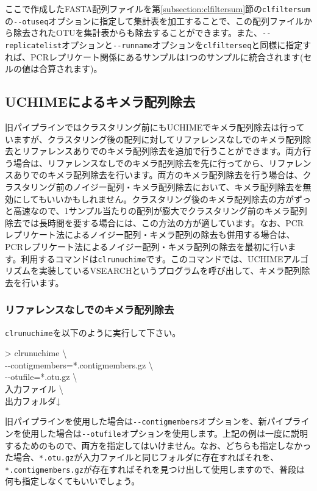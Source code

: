 \documentclass[titlepage,10pt,a4paper]{jsbook}
\newenvironment{cmd}{\begin{oframed}\raggedright\ttfamily\footnotesize\setlength{\baselineskip}{1.4em}}{\end{oframed}\vspace{-1em}}
\begin{document}
ここで作成したFASTA配列ファイルを第\ref{subsection:clfiltersum}節の\texttt{clfiltersum}の\texttt{{-}{-}otuseq}オプションに指定して集計表を加工することで、この配列ファイルから除去されたOTUを集計表からも除去することができます。また、\texttt{{-}{-}replicatelist}オプションと\texttt{{-}{-}runname}オプションを\texttt{clfilterseq}と同様に指定すれば、PCRレプリケート関係にあるサンプルは1つのサンプルに統合されます(セルの値は合算されます)。

\subsection{UCHIMEによるキメラ配列除去}

旧パイプラインではクラスタリング前にもUCHIMEでキメラ配列除去は行っていますが、クラスタリング後の配列に対してリファレンスなしでのキメラ配列除去とリファレンスありでのキメラ配列除去を追加で行うことができます。両方行う場合は、リファレンスなしでのキメラ配列除去を先に行ってから、リファレンスありでのキメラ配列除去を行います。両方のキメラ配列除去を行う場合は、クラスタリング前のノイジー配列・キメラ配列除去において、キメラ配列除去を無効にしてもいいかもしれません。クラスタリング後のキメラ配列除去の方がずっと高速なので、1サンプル当たりの配列が膨大でクラスタリング前のキメラ配列除去では長時間を要する場合には、この方法の方が適しています。なお、PCRレプリケート法によるノイジー配列・キメラ配列の除去も併用する場合は、PCRレプリケート法によるノイジー配列・キメラ配列の除去を最初に行います。利用するコマンドは\texttt{clrunuchime}です。このコマンドでは、UCHIMEアルゴリズムを実装しているVSEARCHというプログラムを呼び出して、キメラ配列除去を行います。

\subsubsection{リファレンスなしでのキメラ配列除去}

\texttt{clrunuchime}を以下のように実行して下さい。
\begin{cmd}
{\textgreater} clrunuchime {\textbackslash}\\
{-}{-}contigmembers=*.contigmembers.gz {\textbackslash}\\
{-}{-}otufile=*.otu.gz {\textbackslash}\\
入力ファイル {\textbackslash}\\
出力フォルダ↓
\end{cmd}
旧パイプラインを使用した場合は\texttt{{-}{-}contigmembers}オプションを、新パイプラインを使用した場合は\texttt{{-}{-}otufile}オプションを使用します。上記の例は一度に説明するためのもので、両方を指定してはいけません。なお、どちらも指定しなかった場合、\texttt{*.otu.gz}が入力ファイルと同じフォルダに存在すればそれを、\texttt{*.contigmembers.gz}が存在すればそれを見つけ出して使用しますので、普段は何も指定しなくてもいいでしょう。
\end{document}
